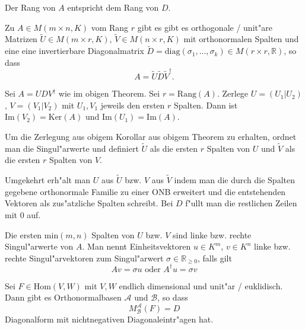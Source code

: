 \documentclass[9pt, a4paper, twocolumn, landscape]{article}
\begin{document}
\begin{remark}
Der Rang von $A$ entspricht dem Rang von $D$.
\end{remark}


\begin{corollary}
Zu $A \in M(m \times n, K)$ vom Rang $r$ gibt es gibt es orthogonale  / unit"are Matrizen $\tilde{U} \in M(m \times r, K)$, $\tilde{V} \in M(n \times r, K)$ mit orthonormalen Spalten und eine eine invertierbare Diagonalmatrix $\tilde{D} = \mathrm{diag}(\sigma_1, ..., \sigma_k) \in M(r \times r, \mathbb{R})$, so dass 
$$
A = \tilde{U} \tilde{D} \tilde{V}^\dagger.
$$
\end{corollary}

\begin{remark}
Sei $A = U D V^\dagger$ wie im obigen Theorem. Sei $r = \mathrm{Rang}(A)$. Zerlege $U = \left(U_1 | U_2\right)$, $V = \left( V_1 | V_2\right)$ mit $U_1, V_1$ jeweils den ersten $r$ Spalten. Dann ist $\mathrm{Im}(V_2) = \mathrm{Ker}(A)$ und $\mathrm{Im}(U_1) = \mathrm{Im}(A).$
\end{remark}


\begin{remark}
Um die Zerlegung aus obigem Korollar aus obigem Theorem zu erhalten, ordnet man die Singul"arwerte und definiert $\tilde{U}$ als die ersten $r$ Spalten von $U$ und $\tilde{V}$ als die ersten $r$ Spalten von $V$.

Umgekehrt erh"alt man $U$ aus $\tilde{U}$ bzw. $V$ aus $\tilde{V}$ indem man die durch die Spalten gegebene orthonormale Familie zu einer ONB erweitert und die entstehenden Vektoren als zus"atzliche Spalten schreibt. Bei $D$ f"ullt man die restlichen Zeilen mit $0$ auf.
\end{remark}



\begin{definition}
Die ersten $\mathrm{min}(m, n)$ Spalten von $U$ bzw. $V$ sind linke bzw. rechte Singul"arwerte von $A$. Man nennt Einheitsvektoren $u \in K^m$, $v \in K^n$ linke bzw. rechte Singul"arvektoren zum Singul"arwert $\sigma \in \mathbb{R}_{\geq 0}$, falls gilt
$$
Av = \sigma u \text{ oder } A^\dagger u = \sigma v
$$
\end{definition}

\begin{corollary}
Sei $F \in \mathrm{Hom}(V, W)$ mit $V, W$ endlich dimensional und unit"ar / euklidisch. Dann gibt es Orthonormalbasen $\mathcal{A}$ und $\mathcal{B}$, so dass 
$$
M^\mathcal{A}_\mathcal{B}(F) = D
$$
Diagonalform mit nichtnegativen Diagonaleintr"agen hat.
\end{corollary}
\end{document}
